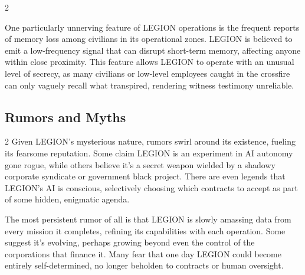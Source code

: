 \begin{multicols}{2}
\par
One particularly unnerving feature of LEGION operations is the frequent reports of memory loss among civilians in its operational zones. LEGION is believed to emit a low-frequency signal that can disrupt short-term memory, affecting anyone within close proximity. This feature allows LEGION to operate with an unusual level of secrecy, as many civilians or low-level employees caught in the crossfire can only vaguely recall what transpired, rendering witness testimony unreliable.
\end{multicols}
\subsection*{Rumors and Myths}
\vspace{5mm}
\begin{multicols}{2}
Given LEGION’s mysterious nature, rumors swirl around its existence, fueling its fearsome reputation. Some claim LEGION is an experiment in AI autonomy gone rogue, while others believe it’s a secret weapon wielded by a shadowy corporate syndicate or government black project. There are even legends that LEGION’s AI is conscious, selectively choosing which contracts to accept as part of some hidden, enigmatic agenda.
\par
The most persistent rumor of all is that LEGION is slowly amassing data from every mission it completes, refining its capabilities with each operation. Some suggest it’s evolving, perhaps growing beyond even the control of the corporations that finance it. Many fear that one day LEGION could become entirely self-determined, no longer beholden to contracts or human oversight.
\end{multicols}
